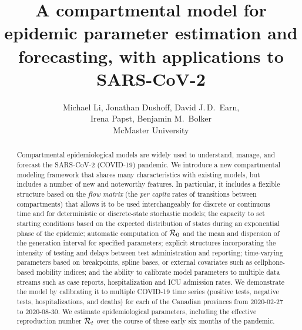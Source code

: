 \documentclass[12pt]{article}\usepackage[]{graphicx}\usepackage[]{color}
\title{A compartmental model for epidemic parameter estimation and forecasting, with applications to SARS-CoV-2}
\author{Michael Li, Jonathan Dushoff, David J.\,D.\ Earn,\\
  Irena Papst, Benjamin M.\ Bolker\\
  McMaster University}
\begin{document}
\linenumbers
\maketitle

\begin{abstract}
Compartmental epidemiological models are widely used to understand, manage, and forecast the SARS-CoV-2 (COVID-19) pandemic. 
We introduce a new compartmental modeling framework that shares many characteristics with existing models, but includes a number of new and noteworthy features.
In particular, it includes a flexible structure based on the \emph{flow matrix} (the \emph{per capita} rates of transitions between compartments) that allows it to be used interchangeably for discrete or continuous time and for deterministic or discrete-state stochastic models; the capacity to set starting conditions based on the expected distribution of states during an exponential phase of the epidemic; automatic computation of ${\mathcal R}_0$ and the mean and dispersion of the generation interval for specified parameters; explicit structures incorporating the intensity of testing and delays between test administration and reporting; time-varying parameters based on breakpoints, spline bases, or external covariates such as cellphone-based mobility indices; and the ability to calibrate model parameters to multiple data streams such as case reports, hospitalization and ICU admission rates.
We demonstrate the model by calibrating it to multiple COVID-19 time series (positive tests, negative tests, hospitalizations, and deaths) for each of the Canadian provinces from 2020-02-27 to 2020-08-30.
We estimate epidemiological parameters, including the effective reproduction number ${\mathcal R}_t$ over the course of these early six months of the pandemic.
\end{abstract}



\end{document}
